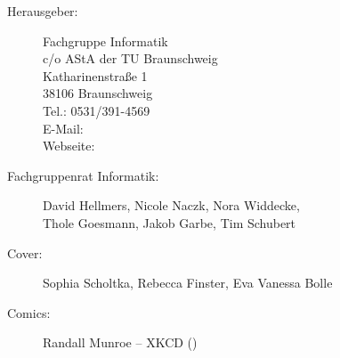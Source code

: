 
\begin{description}
\item[Herausgeber:]
	Fachgruppe Informatik\\
	c/o AStA der TU Braunschweig\\
	Katharinenstraße 1\\
	38106 Braunschweig\\
	Tel.: 0531/391-4569\\
	E-Mail: \\
	Webseite: \fginfoUrl
\item[Fachgruppenrat Informatik:] David Hellmers, Nicole Naczk, Nora Widdecke, \\Thole Goesmann, Jakob Garbe, Tim Schubert 
\item[Cover:] Sophia Scholtka, Rebecca Finster, Eva Vanessa Bolle

\item[Comics:] Randall Munroe -- XKCD ()
\end{description}
